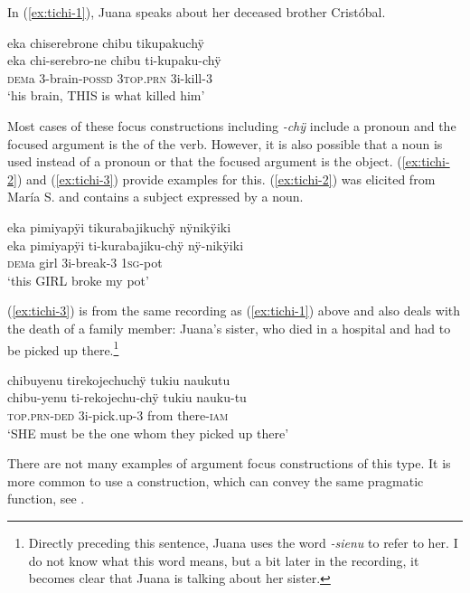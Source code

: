 In (\ref{ex:tichi-1}), Juana speaks about her deceased brother Cristóbal.

\ea\label{ex:tichi-1}
\begingl
\glpreamble eka chiserebrone chibu tikupakuchÿ\\
\gla eka chi-serebro-ne chibu ti-kupaku-chÿ\\
\glb \textsc{dem}a 3-brain-\textsc{possd} 3\textsc{top.prn} 3i-kill-3\\
\glft ‘his brain, THIS is what killed him’
\endgl
\trailingcitation{[jxx-p120430l-2.383]}
\xe

Most cases of these focus constructions including \textit{-chÿ} include a pronoun and the focused argument is the  of the verb. However, it is also possible that a noun is used instead of a pronoun or that the focused argument is the object. (\ref{ex:tichi-2}) and (\ref{ex:tichi-3}) provide examples for this. (\ref{ex:tichi-2}) was elicited from María S. and contains a subject expressed by a noun.

\ea\label{ex:tichi-2}
\begingl
\glpreamble eka pimiyapÿi tikurabajikuchÿ nÿnikÿiki\\
\gla eka pimiyapÿi ti-kurabajiku-chÿ nÿ-nikÿiki\\
\glb \textsc{dem}a girl 3i-break-3 1\textsc{sg}-pot\\
\glft ‘this GIRL broke my pot’
\endgl
\trailingcitation{[rxx-e181024l]}
\xe

(\ref{ex:tichi-3}) is from the same recording as (\ref{ex:tichi-1}) above and also deals with the death of a family member: Juana’s sister, who died in a hospital and had to be picked up there.\footnote{Directly preceding this sentence, Juana uses the word \textit{-sienu} to refer to her. I do not know what this word means, but a bit later in the recording, it becomes clear that Juana is talking about her sister.}

\ea\label{ex:tichi-3}
\begingl
\glpreamble chibuyenu tirekojechuchÿ tukiu naukutu\\
\gla chibu-yenu ti-rekojechu-chÿ tukiu nauku-tu\\
\textsc{top.prn}-\textsc{ded} 3i-pick.up-3 from there-\textsc{iam}\\
\glft ‘SHE must be the one whom they picked up there’
\endgl
\trailingcitation{[jxx-p120430l-2.295]}
\xe

There are not many examples of argument focus constructions of this type. It is more common to use a  construction, which can convey the same pragmatic function, see .

